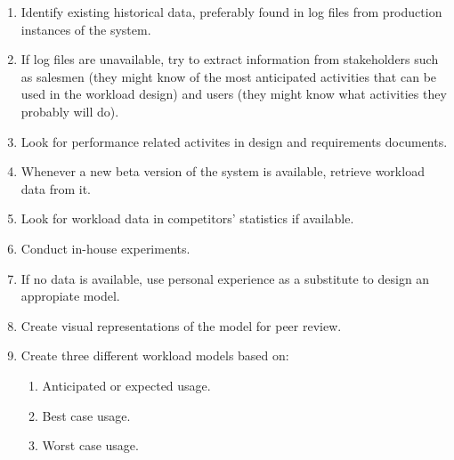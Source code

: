 \begin{enumerate}
  \item Identify existing historical data, preferably found in log files from
    production instances of the system.
  \item If log files are unavailable, try to extract information from
    stakeholders such as salesmen (they might know of the most anticipated
    activities that can be used in the workload design) and users (they might
    know what activities they probably will do).
  \item Look for performance related activites in design and requirements
    documents.
  \item Whenever a new beta version of the system is available, retrieve
    workload data from it.
  \item Look for workload data in competitors' statistics if available.
  \item Conduct in-house experiments.
  \item If no data is available, use personal experience as a substitute to
    design an appropiate model.
  \item Create visual representations of the model for peer review.
  \item Create three different workload models based on:
    \begin{enumerate}
      \item Anticipated or expected usage.
      \item Best case usage.
      \item Worst case usage.
    \end{enumerate}
\end{enumerate}

